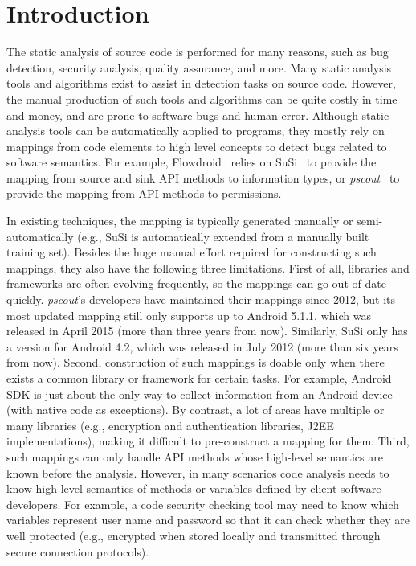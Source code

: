 \section{Introduction}

The static analysis of source code is performed for many reasons, such as bug detection, security analysis, quality assurance, and more. Many static analysis tools and algorithms exist to assist in detection tasks on source code. However, the manual production of such tools and algorithms can be quite costly in time and money, and are prone to software bugs and human error. Although static analysis tools can be automatically applied to programs, they mostly rely on mappings from code elements to high level concepts to detect bugs related to software semantics. For example, Flowdroid~\cite{arzt2014flowdroid} relies on SuSi~\cite{rasthofer2014machine} to provide the mapping from source and sink API methods to information types, or \textit{pscout}~\cite{au2012pscout} to provide the mapping from API methods to permissions. 


In existing techniques, the mapping is typically generated manually or semi-automatically (e.g., SuSi is automatically extended from a manually built training set). Besides the huge manual effort required for constructing such mappings, they also have the following three limitations. First of all, libraries and frameworks are often evolving frequently, so the mappings can go out-of-date quickly. \textit{pscout}'s developers have maintained their mappings since 2012, but its most updated mapping still only supports up to Android 5.1.1, which was released in April 2015 (more than three years from now). Similarly, SuSi only has a version for Android 4.2, which was released in July 2012 (more than six years from now). Second, construction of such mappings is doable only when there exists a common library or framework for certain tasks. For example,  Android SDK is just about the only way to collect information from an Android device (with native code as exceptions). By contrast, a lot of areas have multiple or many libraries (e.g., encryption and authentication libraries, J2EE implementations), making it difficult to pre-construct a mapping for them. Third, such mappings can only handle API methods whose high-level semantics are known before the analysis. However, in many scenarios code analysis needs to know high-level semantics of methods or variables defined by client software developers. For example, a code security checking tool may need to know which variables represent user name and password so that it can check whether they are well protected (e.g., encrypted when stored locally and transmitted through secure connection protocols).


